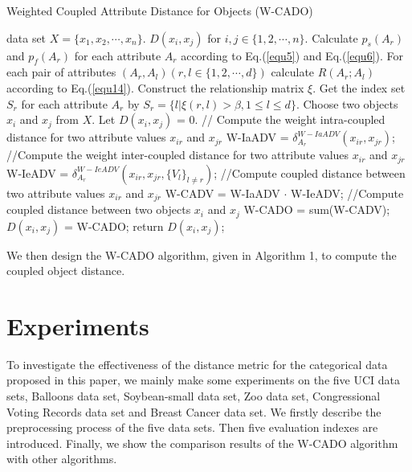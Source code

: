 \documentclass[review]{elsarticle}
\begin{document}
\begin{algorithm}[!ht]
  \caption{Weighted Coupled Attribute Distance for Objects (W-CADO)}
  \label{alg:Weight-CADO}
  \begin{algorithmic}[1]
    data set ${X = \{x_1,x_2,\cdots,x_n\}}$.
    ${D(x_i,x_j)}$ for ${i,j \in \{1,2,\cdots,n\}}$.
   \STATE Calculate ${p_s(A_r)}$ and ${p_f(A_r)}$ for each attribute ${A_r}$ according to Eq.(\ref{equ5}) and Eq.(\ref{equ6}).
   \STATE For each pair of attributes ${(A_r,A_l)(r,l \in \{1,2,\cdots,d\})}$ calculate ${R(A_r;A_l)}$ according to Eq.(\ref{equ14}).
   \STATE Construct the relationship matrix ${\xi}$.
   \STATE Get the index set ${S_r}$ for each attribute ${A_r}$ by ${S_r = \{l|\xi(r,l) > \beta, 1 \leq l \leq d\}}$.
   \STATE Choose two objects ${x_i}$ and ${x_j}$ from ${X}$.
   \STATE Let ${D(x_i,x_j)}$ = 0.
   \STATE // Compute the weight intra-coupled distance for two attribute values $x_{ir}$ and $x_{jr}$
   \STATE W-IaADV = $\delta_{A_r}^{W-IaADV}(x_{ir},x_{jr})$;
   \STATE //Compute the weight inter-coupled distance for two attribute values $x_{ir}$ and $x_{jr}$
   \STATE W-IeADV = $\delta_{A_r}^{W-IeADV}(x_{ir},x_{jr},\{V_l\}_{l \neq r})$;
   \STATE //Compute coupled distance between two attribute values $x_{ir}$ and $x_{jr}$
   \STATE W-CADV = W-IaADV $\cdot$ W-IeADV;
   \STATE //Compute coupled distance between two objects $x_{i}$ and $x_{j}$
   \STATE W-CADO = sum(W-CADV);
   \ENDFOR
   \ENDFOR
   \STATE ${D(x_i,x_j)}$ = W-CADO;
   \STATE return ${D(x_i,x_j)}$;
\end{algorithmic}
\end{algorithm}
We then design the W-CADO algorithm, given in Algorithm 1, to compute the coupled object distance.

\section{Experiments}
To investigate the effectiveness of the distance metric for the categorical data proposed in this paper, we mainly make some experiments on the five UCI data sets, Balloons data set, Soybean-small data set, Zoo data set, Congressional Voting Records data set and Breast Cancer data set. We firstly describe the preprocessing process of the five data sets. Then five evaluation indexes are introduced. Finally, we show the comparison results of the W-CADO algorithm with other algorithms.
\end{document}
